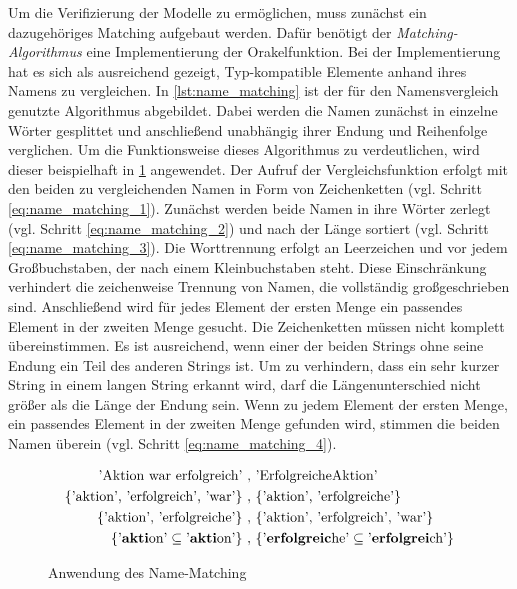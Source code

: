 Um die Verifizierung der Modelle zu ermöglichen, muss zunächst ein dazugehöriges Matching aufgebaut werden.
Dafür benötigt der \emph{Matching-Algorithmus} eine Implementierung der Orakelfunktion.
Bei der Implementierung hat es sich als ausreichend gezeigt, Typ-kompatible Elemente anhand ihres Namens zu vergleichen.
In \cref{lst:name_matching} ist der für den Namensvergleich genutzte Algorithmus abgebildet.
Dabei werden die Namen zunächst in einzelne Wörter gesplittet und anschließend unabhängig ihrer Endung und Reihenfolge verglichen.
Um die Funktionsweise dieses Algorithmus zu verdeutlichen, wird dieser beispielhaft in \cref{eq:name_matching} angewendet.
Der Aufruf der Vergleichsfunktion erfolgt mit den beiden zu vergleichenden Namen in Form von Zeichenketten (vgl. Schritt \ref{eq:name_matching_1}).
Zunächst werden beide Namen in ihre Wörter zerlegt (vgl. Schritt \ref{eq:name_matching_2}) und nach der Länge sortiert (vgl. Schritt \ref{eq:name_matching_3}).
Die Worttrennung erfolgt an Leerzeichen und vor jedem Großbuchstaben, der nach einem Kleinbuchstaben steht.
Diese Einschränkung verhindert die zeichenweise Trennung von Namen, die vollständig großgeschrieben sind.
Anschließend wird für jedes Element der ersten Menge ein passendes Element in der zweiten Menge gesucht.
Die Zeichenketten müssen nicht komplett übereinstimmen.
Es ist ausreichend, wenn einer der beiden Strings ohne seine Endung ein Teil des anderen Strings ist.
Um zu verhindern, dass ein sehr kurzer String in einem langen String erkannt wird, darf die Längenunterschied nicht größer als die Länge der Endung sein.
Wenn zu jedem Element der ersten Menge, ein passendes Element in der zweiten Menge gefunden wird, stimmen die beiden Namen überein (vgl. Schritt \ref{eq:name_matching_4}).

\begin{figure}
    \centering
    \begin{align}
        \text{'Aktion war erfolgreich'}\ ,&\ \text{'ErfolgreicheAktion'} \label{eq:name_matching_1}\\
        \text{\{'aktion', 'erfolgreich', 'war'\}}\ ,&\ \text{\{'aktion', 'erfolgreiche'\}} \label{eq:name_matching_2}\\
        \text{\{'aktion', 'erfolgreiche'\}}\ ,&\ \text{\{'aktion', 'erfolgreich', 'war'\}} \label{eq:name_matching_3}\\
        \text{\{'\textbf{akti}on'} \subseteq \text{'\textbf{akti}on'\}}\ ,&\ \text{\{'\textbf{erfolgreic}he'} \subseteq \text{'\textbf{erfolgrei}ch'\}} \label{eq:name_matching_4}
    \end{align}
    \caption{Anwendung des Name-Matching}
    \label{eq:name_matching}
\end{figure}

